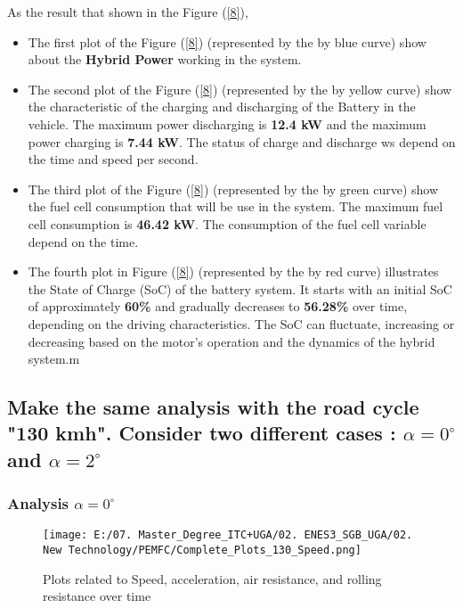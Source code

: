 \documentclass[12pt,a4paper]{article}
\numberwithin{equation}{section}
\begin{document}
{	As the result that shown in the Figure (\ref{8}), 
	\begin{itemize}
		\item The first plot of the Figure (\ref{8}) (represented by the by blue curve) show about the \textbf{Hybrid Power} working in the system.
		\item The second plot of the Figure (\ref{8}) (represented by the by yellow curve) show the characteristic of the charging and discharging of the Battery in the vehicle. The maximum power discharging is \textbf{12.4 kW} and the maximum power charging is \textbf{7.44 kW}. The status of charge and discharge ws depend on the time and speed per second.
		\item  The third plot of the Figure (\ref{8}) (represented by the by green curve) show the fuel cell consumption that will be use in the system. The maximum fuel cell consumption is \textbf{46.42 kW}. The consumption of the fuel cell variable depend on the time.
		\item The fourth plot in Figure (\ref{8}) (represented by the by red curve) illustrates the State of Charge (SoC) of the battery system. It starts with an initial SoC of approximately \textbf{60\%} and gradually decreases to \textbf{56.28\%} over time, depending on the driving characteristics. The SoC can fluctuate, increasing or decreasing based on the motor's operation and the dynamics of the hybrid system.m
		
	\end{itemize}



\subsection{Make the same analysis with the road cycle "130 kmh". Consider two different cases : $\alpha = 0^\circ$ and $\alpha = 2^\circ$ } 	
	\subsubsection{Analysis $\alpha = 0^\circ$}
		\begin{figure}[h]
			\centering 
			\texttt{[image: E:/07. Master\_Degree\_ITC+UGA/02. ENES3\_SGB\_UGA/02. New Technology/PEMFC/Complete\_Plots\_130\_Speed.png]}
			\caption{\small {Plots related to Speed, acceleration, air resistance, and rolling resistance over time}}
			\label{9}
		\end{figure}
	
}
\end{document}
